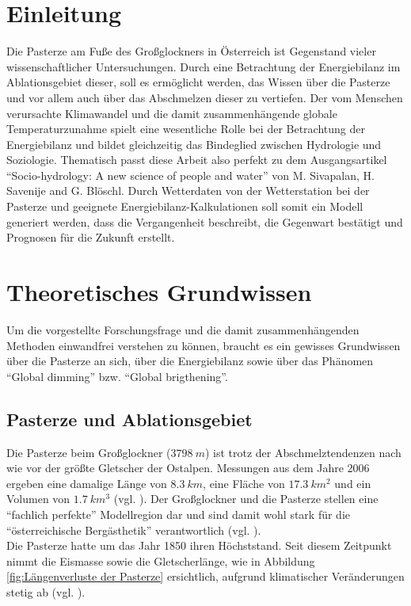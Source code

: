 \documentclass[12pt,a4paper]{article}
\begin{document}
\pagebreak
\ofoot{{\small \pagemark}}
\tableofcontents
\vspace{1cm}

\pagebreak
\listoffigures
\vspace{1cm}

\pagebreak
\listoftables
\vspace{1cm}


\pagebreak
{}  
\setcounter{page}{1}

\section{Einleitung}
Die Pasterze am Fuße des Großglockners in Österreich ist Gegenstand vieler wissenschaftlicher Untersuchungen. Durch eine Betrachtung der Energiebilanz im Ablationsgebiet dieser, soll es ermöglicht werden, das Wissen über die Pasterze und vor allem auch über das Abschmelzen dieser zu vertiefen. Der vom Menschen verursachte Klimawandel und die damit zusammenhängende globale Temperaturzunahme spielt eine wesentliche Rolle bei der Betrachtung der Energiebilanz und bildet gleichzeitig das Bindeglied zwischen Hydrologie und Soziologie. Thematisch passt diese Arbeit also perfekt zu dem Ausgangsartikel ``Socio-hydrology: A new science of people and water'' von M. Sivapalan, H. Savenije and G. Blöschl. Durch Wetterdaten von der Wetterstation bei der Pasterze und geeignete Energiebilanz-Kalkulationen soll somit ein Modell generiert werden, dass die Vergangenheit beschreibt, die Gegenwart bestätigt und Prognosen für die Zukunft erstellt.


\section{Theoretisches Grundwissen}
Um die vorgestellte Forschungsfrage und die damit zusammenhängenden Methoden einwandfrei verstehen zu können, braucht es ein gewisses Grundwissen über die Pasterze an sich, über die Energiebilanz sowie über das Phänomen ``Global dimming'' bzw. ``Global brigthening''.

\subsection{Pasterze und Ablationsgebiet}
Die Pasterze beim Großglockner ($3798~m$) ist trotz der Abschmelztendenzen nach wie vor der größte Gletscher der Ostalpen. Messungen aus dem Jahre 2006 ergeben eine damalige Länge von $8.3~km$, eine Fläche von $17.3~km^2$ und ein Volumen von $1.7~km^3$ (vgl. \cite[10]{Pasterze}). Der Großglockner und die Pasterze stellen eine ``fachlich perfekte'' Modellregion dar und sind damit wohl stark für die ``österreichische Bergästhetik'' verantwortlich (vgl. \cite[13]{Pasterze}).\\
Die Pasterze hatte um das Jahr 1850 ihren Höchststand. Seit diesem Zeitpunkt nimmt die Eismasse sowie die Gletscherlänge, wie in Abbildung \ref{fig:Längenverluste der Pasterze} ersichtlich, aufgrund klimatischer Veränderungen stetig ab (vgl. \cite[17]{Pasterze}).\\
\end{document}
